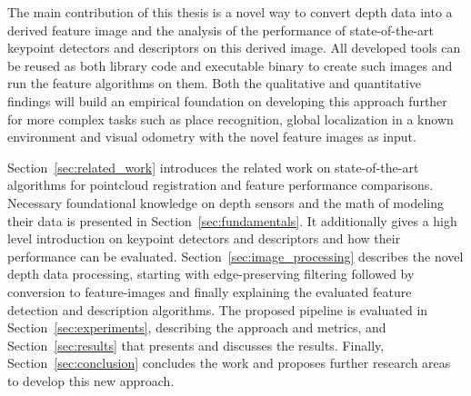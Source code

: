 The main contribution of this thesis is a novel way to convert depth data into a derived feature image and the analysis of the performance of state-of-the-art keypoint detectors and descriptors on this derived image.
All developed tools can be reused as both library code and executable binary to create such images and run the feature algorithms on them.
Both the qualitative and quantitative findings will build an empirical foundation on developing this approach further for more complex tasks such as place recognition, global localization in a known environment and visual odometry with the novel feature images as input.

Section~\ref{sec:related_work} introduces the related work on state-of-the-art algorithms for pointcloud registration and feature performance comparisons.
Necessary foundational knowledge on depth sensors and the math of modeling their data is presented in Section~\ref{sec:fundamentals}.
It additionally gives a high level introduction on keypoint detectors and descriptors and how their performance can be evaluated.
Section~\ref{sec:image_processing} describes the novel depth data processing, starting with edge-preserving filtering followed by conversion to feature-images and finally explaining the evaluated feature detection and description algorithms.
The proposed pipeline is evaluated in Section~\ref{sec:experiments}, describing the approach and metrics, and Section~\ref{sec:results} that presents and discusses the results.
Finally, Section~\ref{sec:conclusion} concludes the work and proposes further research areas to develop this new approach.
